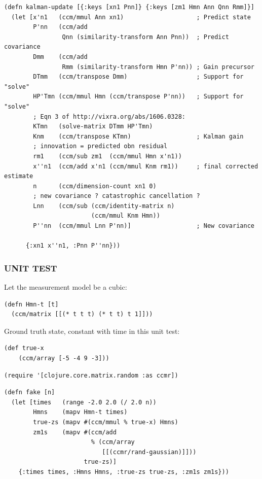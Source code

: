 \documentclass[10pt,oneside,x11names]{article}
\begin{document}
\begin{verbatim}
(defn kalman-update [{:keys [xn1 Pnn]} {:keys [zm1 Hmn Ann Qnn Rmm]}]
  (let [x'n1   (ccm/mmul Ann xn1)                    ; Predict state
        P'nn   (ccm/add
                Qnn (similarity-transform Ann Pnn))  ; Predict covariance
        Dmm    (ccm/add
                Rmm (similarity-transform Hmn P'nn)) ; Gain precursor
        DTmm   (ccm/transpose Dmm)                   ; Support for "solve"
        HP'Tmn (ccm/mmul Hmn (ccm/transpose P'nn))   ; Support for "solve"
        ; Eqn 3 of http://vixra.org/abs/1606.0328:
        KTmn   (solve-matrix DTmm HP'Tmn)
        Knm    (ccm/transpose KTmn)                  ; Kalman gain
        ; innovation = predicted obn residual
        rm1    (ccm/sub zm1  (ccm/mmul Hmn x'n1))
        x''n1  (ccm/add x'n1 (ccm/mmul Knm rm1))     ; final corrected estimate
        n      (ccm/dimension-count xn1 0)
        ; new covariance ? catastrophic cancellation ?
        Lnn    (ccm/sub (ccm/identity-matrix n)
                        (ccm/mmul Knm Hmn))
        P''nn  (ccm/mmul Lnn P'nn)]                  ; New covariance

      {:xn1 x''n1, :Pnn P''nn}))
\end{verbatim}

\subsubsection{UNIT TEST}
\label{unit-test}
Let the measurement model be a cubic:

\begin{verbatim}
(defn Hmn-t [t]
  (ccm/matrix [[(* t t t) (* t t) t 1]]))
\end{verbatim}

Ground truth state, constant with time in this unit test:

\begin{verbatim}
(def true-x
    (ccm/array [-5 -4 9 -3]))
\end{verbatim}

\begin{verbatim}
(require '[clojure.core.matrix.random :as ccmr])
\end{verbatim}

\begin{verbatim}
(defn fake [n]
  (let [times   (range -2.0 2.0 (/ 2.0 n))
        Hmns    (mapv Hmn-t times)
        true-zs (mapv #(ccm/mmul % true-x) Hmns)
        zm1s    (mapv #(ccm/add
                        % (ccm/array
                           [[(ccmr/rand-gaussian)]]))
                      true-zs)]
    {:times times, :Hmns Hmns, :true-zs true-zs, :zm1s zm1s}))
\end{verbatim}
\end{document}
